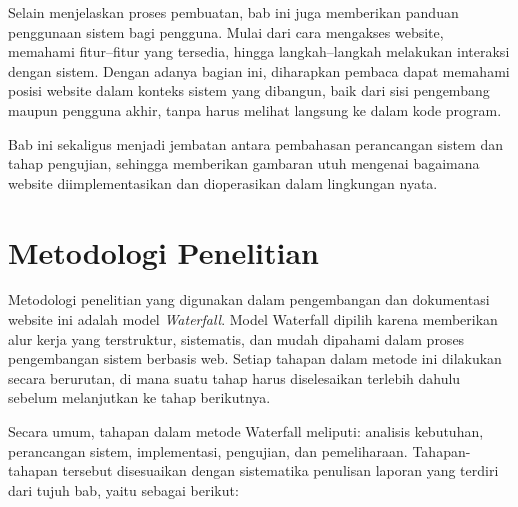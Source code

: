 Selain menjelaskan proses pembuatan, bab ini juga memberikan panduan penggunaan sistem bagi pengguna. Mulai dari cara mengakses website, memahami fitur–fitur yang tersedia, hingga langkah–langkah melakukan interaksi dengan sistem. Dengan adanya bagian ini, diharapkan pembaca dapat memahami posisi website dalam konteks sistem yang dibangun, baik dari sisi pengembang maupun pengguna akhir, tanpa harus melihat langsung ke dalam kode program.

Bab ini sekaligus menjadi jembatan antara pembahasan perancangan sistem dan tahap pengujian, sehingga memberikan gambaran utuh mengenai bagaimana website diimplementasikan dan dioperasikan dalam lingkungan nyata.




\section{Metodologi Penelitian}
Metodologi penelitian yang digunakan dalam pengembangan dan dokumentasi website ini adalah model \textit{Waterfall}. Model Waterfall dipilih karena memberikan alur kerja yang terstruktur, sistematis, dan mudah dipahami dalam proses pengembangan sistem berbasis web. Setiap tahapan dalam metode ini dilakukan secara berurutan, di mana suatu tahap harus diselesaikan terlebih dahulu sebelum melanjutkan ke tahap berikutnya.

Secara umum, tahapan dalam metode Waterfall meliputi: analisis kebutuhan, perancangan sistem, implementasi, pengujian, dan pemeliharaan. Tahapan-tahapan tersebut disesuaikan dengan sistematika penulisan laporan yang terdiri dari tujuh bab, yaitu sebagai berikut:

